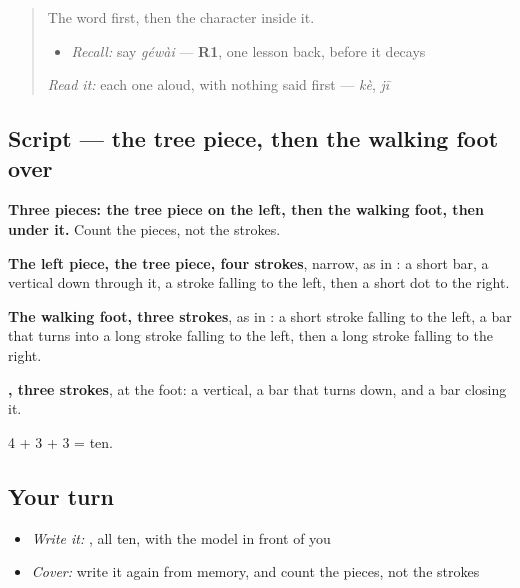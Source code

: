 \begin{quote}
The word first, then the character inside it.

\begin{itemize}
\raggedright
  \item \emph{Recall:} say \emph{géwài} — \textbf{R1}, one lesson back, before it decays
\end{itemize}

\begin{quote}
 
\end{quote}

\emph{Read it:} each one aloud, with nothing said first — \emph{kè}, \emph{jī}
\end{quote}

\subsection*{Script — the tree piece, then the walking foot over }

\begin{quote}
\end{quote}

\textbf{Three pieces: the tree piece on the left, then the walking foot, then  under it.} Count the pieces, not the strokes.

\textbf{The left piece, the tree piece, four strokes}, narrow, as in : a short bar, a vertical down through it, a stroke falling to the left, then a short dot to the right.

\textbf{The walking foot, three strokes}, as in : a short stroke falling to the left, a bar that turns into a long stroke falling to the left, then a long stroke falling to the right.

\textbf{, three strokes}, at the foot: a vertical, a bar that turns down, and a bar closing it.

4 + 3 + 3 = ten.

\subsection*{Your turn}
\begin{itemize}
\raggedright
  \item \emph{Write it:} , all ten, with the model in front of you
  \item \emph{Cover:} write it again from memory, and count the pieces, not the strokes
\end{itemize}

